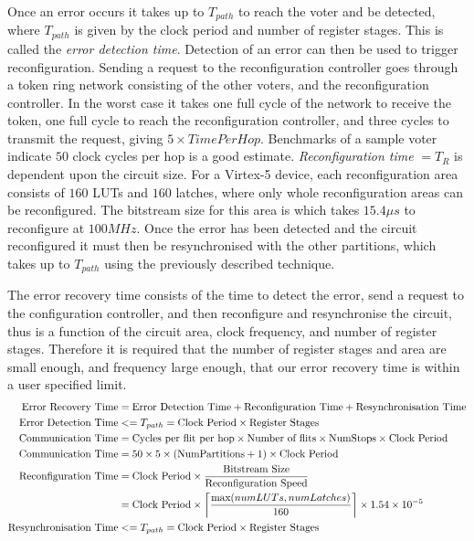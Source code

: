 \documentclass[12pt,final,oneside]{dwThesis} %
\begin{document}
   Once an error occurs it takes up to $T_{path}$ to reach the voter and be detected, where $T_{path}$ is given by the clock period and number of register stages. This is called the \textit{error detection time}. Detection of an error can then be used to trigger reconfiguration.
   Sending a request to the reconfiguration controller goes through a token ring network consisting of the other voters, and the reconfiguration controller. In the worst case it takes one full cycle of the network to receive the token, one full cycle to reach the reconfiguration controller, and three cycles to transmit the request, giving $5\times TimePerHop$. Benchmarks of a sample voter indicate $50$ clock cycles per hop is a good estimate.
   \textit{Reconfiguration time} $= T_R$ is dependent upon the circuit size. For a Virtex-5 device, each reconfiguration area consists of $160$ \acp{LUT} and $160$ latches, where only whole reconfiguration areas can be reconfigured. The bitstream size for this area is  which takes $15.4\mu{}s$ to reconfigure at $100MHz$.
   Once the error has been detected and the circuit reconfigured it must then be resynchronised with the other partitions, which takes up to $T_{path}$ using the previously described technique.

   The error recovery time consists of the time to detect the error, send a request to the configuration controller, and then reconfigure and resynchronise the circuit, thus is a function of the circuit area, clock frequency, and number of register stages. Therefore it is required that the number of register stages and area are small enough, and frequency large enough, that our error recovery time is within a user specified limit.
   \begin{align}
      \mbox{Error Recovery Time} &=\mbox{Error Detection Time} + \mbox{Reconfiguration Time} + \mbox{Resynchronisation Time}\notag\\
      \mbox{Error Detection Time} &<= T_{path} = \mbox{Clock Period}\times\mbox{Register Stages}\notag\\
      \mbox{Communication Time} &= \mbox{Cycles per flit per hop}\times\mbox{Number of flits}\times\mbox{NumStops}\times \mbox{Clock Period}\notag\\
      \mbox{Communication Time} &= 50\times 5\times (\mbox{NumPartitions}+1)\times \mbox{Clock Period}\notag\\
      \mbox{Reconfiguration Time} &= \mbox{Clock Period}\times \frac{\mbox{Bitstream Size}}{\mbox{Reconfiguration Speed}}\notag\\
      &= \mbox{Clock Period}\times \left\lceil \frac{\mbox{max}(numLUTs, numLatches)}{160}\right\rceil\times 1.54\times10^{-5}\notag\\
      \mbox{Resynchronisation Time} &<= T_{path} = \mbox{Clock Period}\times\mbox{Register Stages}\notag\\
   \end{align}\cite{DiesselChange}
\end{document}
